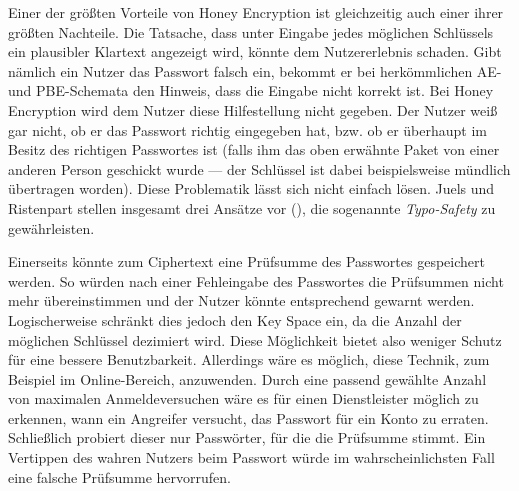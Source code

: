 
Einer der größten Vorteile von Honey Encryption ist gleichzeitig auch einer ihrer größten Nachteile. Die Tatsache, dass unter Eingabe jedes möglichen Schlüssels ein plausibler Klartext angezeigt wird, könnte dem Nutzererlebnis schaden. Gibt nämlich ein Nutzer das Passwort falsch ein, bekommt er bei herkömmlichen AE- und PBE-Schemata den Hinweis, dass die Eingabe nicht korrekt ist. Bei Honey Encryption wird dem Nutzer diese Hilfestellung nicht gegeben. Der Nutzer weiß gar nicht, ob er das Passwort richtig eingegeben hat, bzw. ob er überhaupt im Besitz des richtigen Passwortes ist (falls ihm das oben erwähnte Paket von einer anderen Person geschickt wurde --- der Schlüssel ist dabei beispielsweise mündlich übertragen worden). Diese Problematik lässt sich nicht einfach lösen. Juels und Ristenpart stellen insgesamt drei Ansätze vor (\cite{CRCS2014, EURO2014}), die sogenannte \emph{Typo-Safety} zu gewährleisten. 

Einerseits könnte zum Ciphertext eine Prüfsumme des Passwortes gespeichert werden. So würden nach einer Fehleingabe des Passwortes die Prüfsummen nicht mehr übereinstimmen und der Nutzer könnte entsprechend gewarnt werden. Logischerweise schränkt dies jedoch den Key Space ein, da die Anzahl der möglichen Schlüssel dezimiert wird. Diese Möglichkeit bietet also weniger Schutz für eine bessere Benutzbarkeit. Allerdings wäre es möglich, diese Technik, zum Beispiel im Online-Bereich, anzuwenden. Durch eine passend gewählte Anzahl von maximalen Anmeldeversuchen wäre es für einen Dienstleister möglich zu erkennen, wann ein Angreifer versucht, das Passwort für ein Konto zu erraten. Schließlich probiert dieser nur Passwörter, für die die Prüfsumme stimmt. Ein Vertippen des wahren Nutzers beim Passwort würde im wahrscheinlichsten Fall eine falsche Prüfsumme hervorrufen. 

